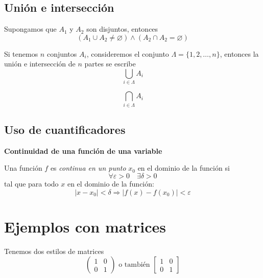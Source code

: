\documentclass[letterpaper,twoside]{article}
\begin{document}
\subsection{Uni\'on e intersecci\'on}

Supongamos que $A_1$ y $A_2$ son disjuntos, entonces
$$
(A_1 \cup A_2 \neq \varnothing) \wedge (A_2 \cap A_2 = \varnothing)
$$

Si tenemos $n$ conjuntos $A_i$, consideremos el conjunto $\Lambda = \{1,2,\ldots , n\}$, entonces la uni\'on e intersecci\'on de $n$ partes se escribe
$$
\bigcup_{i\in \Lambda} A_i
$$

$$
\bigcap_{i\in \Lambda} A_i
$$

\subsection{Uso de cuantificadores}

\textbf{Continuidad de una funci\'on de una variable}

Una funci\'on $f$ es \emph{continua en un punto} $x_0$ en el dominio de la funci\'on
si
$$\forall \varepsilon > 0 \quad \exists \delta> 0$$
tal que para todo $x$ en el dominio de la funci\'on:
$$|x-x_0|<\delta \Rightarrow |f(x)-f(x_0)|<\varepsilon$$

\newpage

\section{Ejemplos con matrices}

Tenemos dos estilos de matrices
$$
\begin{pmatrix}
1 & 0 \\
0 & 1
\end{pmatrix}
\text{ o tambi\'en }
\begin{bmatrix}
1 & 0 \\
0 & 1
\end{bmatrix}
$$
\end{document}
